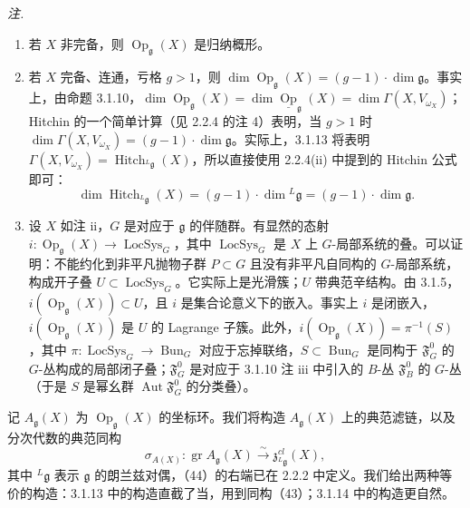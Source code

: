 \emph{注.}
\begin{enumerate}[label=(\roman*),leftmargin=2.2em]
\item 若 $X$ 非完备，则 $\operatorname{Op}_{\mathfrak{g}}(X)$ 是归纳概形。
\item 若 $X$ 完备、连通，亏格 $g > 1$，则 $\dim\operatorname{Op}_{\mathfrak{g}}(X) = (g-1)\cdot\dim\mathfrak{g}$。事实上，由命题 3.1.10，$\dim\operatorname{Op}_{\mathfrak{g}}(X) = \dim\underline{\operatorname{Op}}_{\mathfrak{g}}(X) = \dim\Gamma(X,V_{\omega_X})$；Hitchin 的一个简单计算（见 2.2.4 的注 4）表明，当 $g > 1$ 时 $\dim\Gamma(X,V_{\omega_X}) = (g-1)\cdot\dim\mathfrak{g}$。实际上，3.1.13 将表明 $\Gamma(X,V_{\omega_X}) = \operatorname{Hitch}_{{}^{L}\mathfrak{g}}(X)$，所以直接使用 2.2.4(ii) 中提到的 Hitchin 公式即可：
\[
\dim\operatorname{Hitch}_{{}^{L}\mathfrak{g}}(X) = (g-1)\cdot\dim{}^{L}\mathfrak{g} = (g-1)\cdot\dim\mathfrak{g}.
\]
\item 设 $X$ 如注 ii，$G$ 是对应于 $\mathfrak{g}$ 的伴随群。有显然的态射 $i: \operatorname{Op}_{\mathfrak{g}}(X) \to \operatorname{LocSys}_G$，其中 $\operatorname{LocSys}_G$ 是 $X$ 上 $G$-局部系统的叠。可以证明：不能约化到非平凡抛物子群 $P \subset G$ 且没有非平凡自同构的 $G$-局部系统，构成开子叠 $U \subset \operatorname{LocSys}_G$。它实际上是光滑簇；$U$ 带典范辛结构。由 3.1.5，$i(\operatorname{Op}_{\mathfrak{g}}(X)) \subset U$，且 $i$ 是集合论意义下的嵌入。事实上 $i$ 是闭嵌入，$i(\operatorname{Op}_{\mathfrak{g}}(X))$ 是 $U$ 的 Lagrange 子簇。此外，$i(\operatorname{Op}_{\mathfrak{g}}(X)) = \pi^{-1}(S)$，其中 $\pi: \operatorname{LocSys}_G \to \operatorname{Bun}_G$ 对应于忘掉联络，$S \subset \operatorname{Bun}_G$ 是同构于 $\mathfrak{F}_G^0$ 的 $G$-丛构成的局部闭子叠；$\mathfrak{F}_G^0$ 是对应于 3.1.10 注 iii 中引入的 $B$-丛 $\mathfrak{F}_B^0$ 的 $G$-丛（于是 $S$ 是幂幺群 $\operatorname{Aut}\mathfrak{F}_G^0$ 的分类叠）。
\end{enumerate}

 记 $A_{\mathfrak{g}}(X)$ 为 $\operatorname{Op}_{\mathfrak{g}}(X)$ 的坐标环。我们将构造 $A_{\mathfrak{g}}(X)$ 上的典范滤链，以及分次代数的典范同构
\begin{equation}\tag{44}
\sigma_{A(X)}: \operatorname{gr} A_{\mathfrak{g}}(X) \xrightarrow{\sim} \mathfrak{z}^{cl}_{{}^{L}\mathfrak{g}}(X),
\end{equation}
其中 ${}^{L}\mathfrak{g}$ 表示 $\mathfrak{g}$ 的朗兰兹对偶，（44）的右端已在 2.2.2 中定义。我们给出两种等价的构造：3.1.13 中的构造直截了当，用到同构（43）；3.1.14 中的构造更自然。

